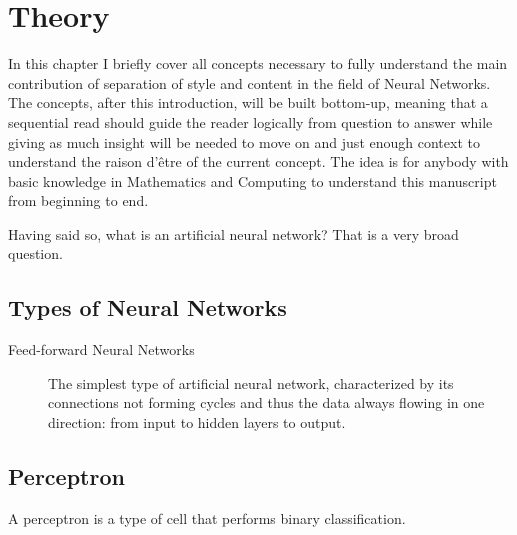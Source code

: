 
\chapter{Theory}
\label{sec:theory}


In this chapter I briefly cover all concepts necessary to fully understand the main contribution of separation of style and content in the field of Neural Networks.
The concepts, after this introduction, will be built bottom-up, meaning that a sequential read should guide the reader logically from question to answer while giving as much insight will be needed to move on and just enough context to understand the raison d'être of the current concept.
The idea is for anybody with basic knowledge in Mathematics and Computing to understand this manuscript from beginning to end.

Having said so, what is an artificial neural network?
That is a very broad question.




\section{Types of Neural Networks}
\label{sec:Types of Neural Networks}

\begin{description}
  \item[Feed-forward Neural Networks]
  The simplest type of artificial neural network, characterized by its connections not forming cycles and thus the data always flowing in one direction: from input to hidden layers to output.
\end{description}



\section{Perceptron}
\label{sec:Perceptron}
A perceptron is a type of cell that performs binary classification.

